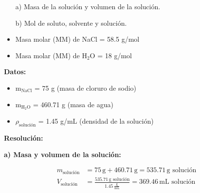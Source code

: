 \documentclass{article}
\begin{document}
\begin{itemize} \item[a)] Masa de la solución y volumen de la solución. \item[b)] Mol de soluto, solvente y solución. \end{itemize}

\begin{itemize} \item Masa molar (MM) de NaCl = 58.5 g/mol \item Masa molar (MM) de H$_2$O = 18 g/mol \end{itemize}

\noindent\textbf{Datos:} %


\textbf{} %
\begin{itemize}
\item m$_{\text{NaCl}}$ = 75 g (masa de cloruro de sodio)
\item m$_{\text{H}_2\text{O}}$ = 460.71 g (masa de agua)
\item $\rho_{\text{solución}}$ = 1.45 g/mL (densidad de la solución)
\end{itemize}


\noindent\textbf{Resolución:} %

\textbf{a) Masa y volumen de la solución:}

\begin{align*}
    m_{\text{solución}} &= 75 \, \text{g} + 460.71 \, \text{g} = 535.71 \, \text{g solución} \\[10pt]
    V_{\text{solución}} &= \frac{535.71 \, \text{g solución}}{1.45 \, \frac{\text{g}}{\text{mL}}} = 369.46 \, \text{mL solución}
\end{align*}
\end{document}
